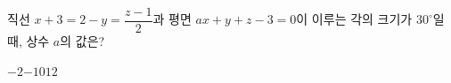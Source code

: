직선 $x+3=2-y=\dfrac{z-1}{2}$과 평면 $ax+y+z-3=0$이 이루는 각의 크기가 $30^\circ$일 때, 상수 $a$의 값은?
\begin{choices32}{$-2$}{$-1$}{$0$}{$1$}{$2$}\end{choices32}

